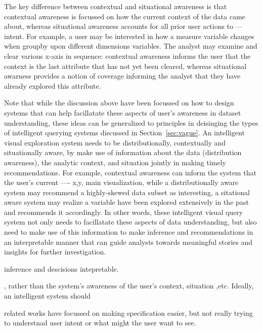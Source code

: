 \par The key difference between contextual and situational awareness is that contextual awareness is focussed on how the current context of the data came about, whereas situational awareness accounts for all prior user actions to --- intent. For example, a user may be interested in how a measure variable changes when groupby upon different dimensions variables. The analyst may examine and clear various x-axis in sequence: contextual awareness informs the user that the context is the last attribute that has not yet been cleared, whereas situational awarness provides a notion of coverage informing the analyst that they have already explored this attribute.

\par Note that while the discussion above have been focussed on how to design systems that can help facillatate these aspects of user's awareness in dataset understanding, these ideas can be generalized to principles in deisinging the types of intelligent querying systems discussed in Section~\ref{sec:vague}. An intelligent visual exploration system needs to be distributionally, contextually and situationally aware, by make use of information about the data (distribution awareness), the analytic context, and situation jointly in making timely recommendations. For example, contextual awareness can inform the system that the user's current ---- x,y, main visualization, while a distributionally aware system may recommend a highly-skewed data subset as interesting, a sitational aware system may realize a variable have been explored extensively in the past and recommends it accordingly. In other words, these intelligent visual query system not only needs to facillatate these aspects of data understanding, but also need to make use of this information to make inference and recommendations in an interpretable manner that can guide analysts towards meaningful stories and insights for further investigation.

inference and descisions intepretable.

, rather than the system's awareness of the user's context, situation ,etc. Ideally, an intelligent system  should 


related works have focussed on making specification easier, but not really trying to understnad user intent or what might the user want to see.
